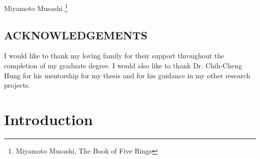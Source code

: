 \documentclass[12pt]{article}
\newcommand{\toppage}{\vspace*{0.3in}}
\begin{document}
\vspace{0.5in}
\hspace*{\fill} Miyamoto Musashi \footnote{Miyamoto Musashi, The Book of Five
    Rings}
\newpage

\toppage
\begin{center}
    \section{ACKNOWLEDGEMENTS}
\end{center}
\vspace{0.5in}

\noindent I would like to thank my loving family for their support throughout
the completion of my graduate degree. I would also like to thank Dr. Chih-Cheng
Hung for his mentorship for my thesis and for his guidance in my other research
projects.
\newpage

\begin{center}
    \tableofcontents
\end{center}
\newpage

\begin{center}
    \listoffigures
\end{center}
\newpage

\begin{center}
    \listoftables
\end{center}
\newpage

\section{Introduction}
\end{document}
